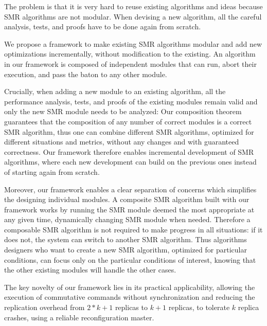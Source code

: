 The problem is that it is very hard to reuse existing algorithms and ideas because SMR algorithms are not modular. When devising a new algorithm, all the careful analysis, tests, and proofs have to be done again from scratch.

We propose a framework to make existing SMR algorithms modular and add new optimizations incrementally, without modification to the existing. 
An algorithm in our framework is composed of independent modules that can run, abort their execution, and pass the baton to any other module.

Crucially, when adding a new module to an existing algorithm, all the performance analysis, tests, and proofs of the existing modules remain valid and only the new SMR module needs to be analyzed: Our composition theorem guarantees that the composition of any number of correct modules is a correct SMR algorithm, thus one can combine different SMR algorithms, optimized for different situations and metrics, without any changes and with guaranteed correctness.
Our framework therefore enables incremental development of SMR algorithms, where each new development can build on the previous ones instead of starting again from scratch.

Moreover, our framework enables a clear separation of concerns  which simplifies the designing individual modules.
A composite SMR algorithm built with our framework works by running the SMR module deemed the most appropriate at any given time, dynamically changing SMR module when needed. Therefore a composable SMR algorithm is not required to make progress in all situations: if it does not, the system can switch to another SMR algorithm.
Thus algorithms designers who want to create a new SMR algorithm, optimized for particular conditions, can focus only on the particular conditions of interest, knowing that the other existing modules will handle the other cases. 

The key novelty of our framework lies in its practical applicability, allowing the execution of commutative commands without synchronization and reducing the replication overhead from $2*k+1$ replicas to $k+1$ replicas, to tolerate $k$ replica crashes, using a reliable reconfiguration master.


